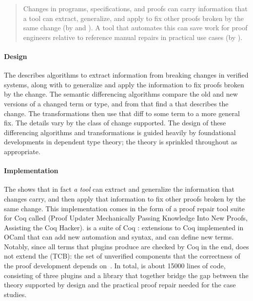 \begin{quote}
Changes in programs, specifications, and proofs can carry information that a tool can extract, generalize, and apply to fix other proofs broken by the same change (by  and ). A tool that automates this can save work for proof engineers relative to reference manual repairs in practical use cases (by ).
\end{quote}

\paragraph{Design}
The  describes  algorithms to extract information from breaking changes in verified systems,
along with  to generalize and apply the information to fix proofs broken by the change.
The semantic differencing algorithms compare the old and new versions of a changed term or type,
and from that find a  that describes the change.
The transformations then use that diff to  some term to a more general fix.
The details vary by the class of change supported.
The design of these differencing algorithms and transformations is guided heavily by foundational developments in dependent type theory;
the theory is sprinkled throughout as appropriate.

\paragraph{Implementation}
The  shows that in fact \textit{a tool} can extract and generalize the information that changes carry,
and then apply that information to fix other proofs broken by the same change.
This implementation comes in the form of a proof repair tool suite for Coq called \intro{\sysnamelong} (Proof Updater Mechanically Passing Knowledge Into New Proofs, Assisting the Coq Hacker).
\sysnamelong is a suite of Coq : extensions to Coq implemented in OCaml that can add new automation and syntax, and can define new terms.
Notably, since all terms that plugins produce are checked by Coq in the end, \sysnamelong does not extend the  (TCB):
the set of unverified components that the correctness of the proof development depends on~\cite{PGL-045}.
In total, \sysnamelong is about 15000 lines of code,
consisting of three plugins and a library that together bridge the gap between the theory supported by design and the practical proof repair needed for the case studies.

